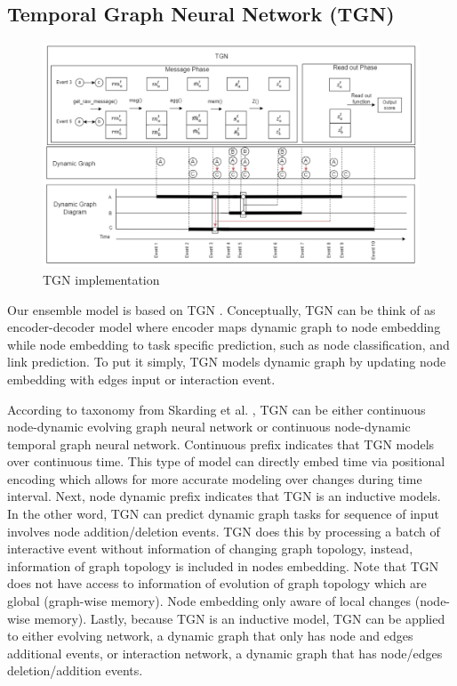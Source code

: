 \documentclass{IEEEtran}
\begin{document}
\subsection{Temporal Graph Neural Network (TGN)}
\label{sec:orgf337c0c}

\begin{figure}[htbp]
\centering
\includegraphics[width=.9\linewidth]{./images/screenshot_20220425_113310.png}
\caption{\label{TGN implementation}TGN implementation}
\end{figure}

Our ensemble model is based on TGN \cite{rossi2020temporal}. Conceptually, TGN can be think of as encoder-decoder model where encoder maps dynamic graph to node embedding while node embedding to task specific prediction, such as node classification, and link prediction. To put it simply, TGN models dynamic graph by updating node embedding with edges input or interaction event.

According to taxonomy from Skarding et al. \cite{skardingFoundationsModelingDynamic2021}, TGN can be either continuous node-dynamic evolving graph neural network or continuous node-dynamic temporal graph neural network. Continuous prefix indicates that TGN models over continuous time. This type of model can directly embed time via positional encoding which allows for more accurate modeling over changes during time interval. Next, node dynamic prefix indicates that TGN is an inductive models. In the other word, TGN can predict dynamic graph tasks for sequence of input involves node addition/deletion events. TGN does this by processing a batch of interactive event without information of changing graph topology, instead, information of graph topology is included in nodes embedding. Note that TGN does not have access to information of evolution of graph topology which are global (graph-wise memory). Node embedding only aware of local changes (node-wise memory). Lastly, because TGN is an inductive model, TGN can be applied to either evolving network, a dynamic graph that only has node and edges additional events, or interaction network, a dynamic graph that has node/edges deletion/addition events.
\end{document}
